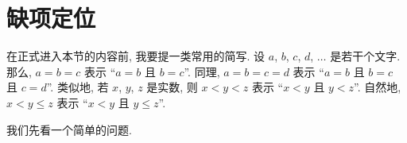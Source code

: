\documentclass[../libro.tex]{subfiles}
\begin{document}

\section{缺项定位}

在正式进入本节的内容前,
我要提一类常用的简写.
设 \(a\), \(b\), \(c\), \(d\), \(\dots\) 是若干个文字.
那么, \(a = b = c\) 表示
``\(a = b\) 且 \(b = c\)''.
同理, \(a = b = c = d\) 表示
``\(a = b\) 且 \(b = c\) 且 \(c = d\)''.
类似地, 若 \(x\), \(y\), \(z\) 是实数,
则 \(x < y < z\) 表示
``\(x < y\) 且 \(y < z\)''.
自然地, \(x < y \leq z\) 表示
``\(x < y\) 且 \(y \leq z\)''.

\vspace{2ex}

我们先看一个简单的问题.
\end{document}
